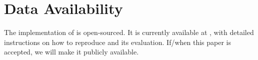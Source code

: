 \newpage

\section* {\centering  Data Availability}

The implementation of \system is open-sourced. It is 
currently available at \cite{TRAPSAnonOpenSource}, with detailed 
instructions on how to reproduce \system and its evaluation. 
If/when this paper is accepted, we will make it publicly 
available.\\ \\
